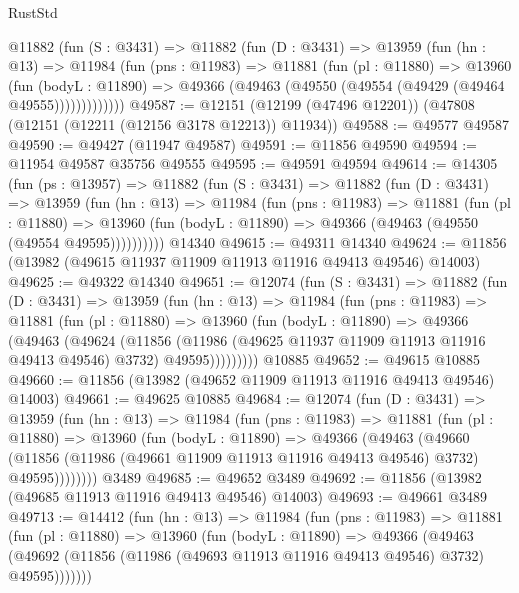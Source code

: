 \begin{lexlean}{RustStd}
\begin{coremodule}
      @11882
        (fun (S : @3431) =>
        @11882
          (fun (D : @3431) =>
          @13959
            (fun (hn : @13) =>
            @11984
              (fun (pns : @11983) =>
              @11881
                (fun (pl : @11880) =>
                @13960
                  (fun (bodyL : @11890) =>
                  @49366 (@49463 (@49550 (@49554 (@49429 (@49464 @49555)))))))))))))
@49587 := @12151 (@12199 (@47496 @12201)) (@47808 (@12151 (@12211 (@12156 @3178 @12213)) @11934))
@49588 := @49577 @49587
@49590 := @49427 (@11947 @49587)
@49591 := @11856 @49590
@49594 := @11954 @49587 @35756 @49555
@49595 := @49591 @49594
@49614 := @14305
    (fun (ps : @13957) =>
    @11882
      (fun (S : @3431) =>
      @11882
        (fun (D : @3431) =>
        @13959
          (fun (hn : @13) =>
          @11984
            (fun (pns : @11983) =>
            @11881
              (fun (pl : @11880) =>
              @13960 (fun (bodyL : @11890) => @49366 (@49463 (@49550 (@49554 @49595))))))))))
    @14340
@49615 := @49311 @14340
@49624 := @11856 (@13982 (@49615 @11937 @11909 @11913 @11916 @49413 @49546) @14003)
@49625 := @49322 @14340
@49651 := @12074
    (fun (S : @3431) =>
    @11882
      (fun (D : @3431) =>
      @13959
        (fun (hn : @13) =>
        @11984
          (fun (pns : @11983) =>
          @11881
            (fun (pl : @11880) =>
            @13960
              (fun (bodyL : @11890) =>
              @49366
                (@49463
                  (@49624
                    (@11856
                      (@11986 (@49625 @11937 @11909 @11913 @11916 @49413 @49546) @3732)
                      @49595)))))))))
    @10885
@49652 := @49615 @10885
@49660 := @11856 (@13982 (@49652 @11909 @11913 @11916 @49413 @49546) @14003)
@49661 := @49625 @10885
@49684 := @12074
    (fun (D : @3431) =>
    @13959
      (fun (hn : @13) =>
      @11984
        (fun (pns : @11983) =>
        @11881
          (fun (pl : @11880) =>
          @13960
            (fun (bodyL : @11890) =>
            @49366
              (@49463
                (@49660
                  (@11856 (@11986 (@49661 @11909 @11913 @11916 @49413 @49546) @3732) @49595))))))))
    @3489
@49685 := @49652 @3489
@49692 := @11856 (@13982 (@49685 @11913 @11916 @49413 @49546) @14003)
@49693 := @49661 @3489
@49713 := @14412
    (fun (hn : @13) =>
    @11984
      (fun (pns : @11983) =>
      @11881
        (fun (pl : @11880) =>
        @13960
          (fun (bodyL : @11890) =>
          @49366
            (@49463
              (@49692 (@11856 (@11986 (@49693 @11913 @11916 @49413 @49546) @3732) @49595)))))))

\end{coremodule}
\end{lexlean}

